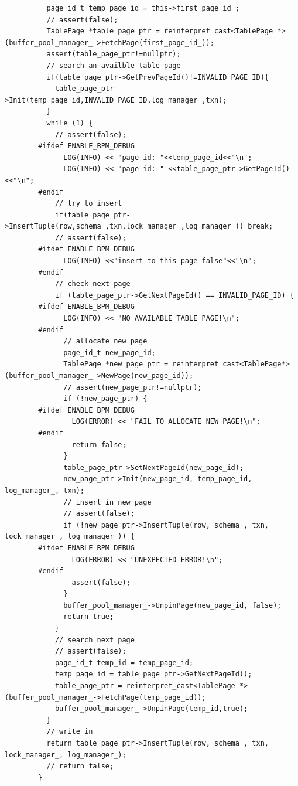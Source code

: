 \documentclass{article}
\begin{document}
\begin{appendices}
\begin{lstlisting}
          page_id_t temp_page_id = this->first_page_id_;
          // assert(false);
          TablePage *table_page_ptr = reinterpret_cast<TablePage *>(buffer_pool_manager_->FetchPage(first_page_id_));
          assert(table_page_ptr!=nullptr);
          // search an availble table page
          if(table_page_ptr->GetPrevPageId()!=INVALID_PAGE_ID){
            table_page_ptr->Init(temp_page_id,INVALID_PAGE_ID,log_manager_,txn);
          }
          while (1) {
            // assert(false);
        #ifdef ENABLE_BPM_DEBUG
              LOG(INFO) << "page id: "<<temp_page_id<<"\n";
              LOG(INFO) << "page id: " <<table_page_ptr->GetPageId()<<"\n";
        #endif
            // try to insert
            if(table_page_ptr->InsertTuple(row,schema_,txn,lock_manager_,log_manager_)) break;
            // assert(false);
        #ifdef ENABLE_BPM_DEBUG
              LOG(INFO) <<"insert to this page false"<<"\n";
        #endif
            // check next page
            if (table_page_ptr->GetNextPageId() == INVALID_PAGE_ID) {
        #ifdef ENABLE_BPM_DEBUG
              LOG(INFO) << "NO AVAILABLE TABLE PAGE!\n";
        #endif
              // allocate new page
              page_id_t new_page_id;
              TablePage *new_page_ptr = reinterpret_cast<TablePage*>(buffer_pool_manager_->NewPage(new_page_id));
              // assert(new_page_ptr!=nullptr);
              if (!new_page_ptr) {
        #ifdef ENABLE_BPM_DEBUG
                LOG(ERROR) << "FAIL TO ALLOCATE NEW PAGE!\n";
        #endif
                return false;
              }
              table_page_ptr->SetNextPageId(new_page_id);
              new_page_ptr->Init(new_page_id, temp_page_id, log_manager_, txn);
              // insert in new page
              // assert(false);
              if (!new_page_ptr->InsertTuple(row, schema_, txn, lock_manager_, log_manager_)) {
        #ifdef ENABLE_BPM_DEBUG
                LOG(ERROR) << "UNEXPECTED ERROR!\n";
        #endif
                assert(false);
              }
              buffer_pool_manager_->UnpinPage(new_page_id, false);
              return true;
            }
            // search next page
            // assert(false);
            page_id_t temp_id = temp_page_id;
            temp_page_id = table_page_ptr->GetNextPageId();
            table_page_ptr = reinterpret_cast<TablePage *>(buffer_pool_manager_->FetchPage(temp_page_id));
            buffer_pool_manager_->UnpinPage(temp_id,true);
          }
          // write in
          return table_page_ptr->InsertTuple(row, schema_, txn, lock_manager_, log_manager_);
          // return false;
        }
        

\end{lstlisting}
\end{appendices}
\end{document}
